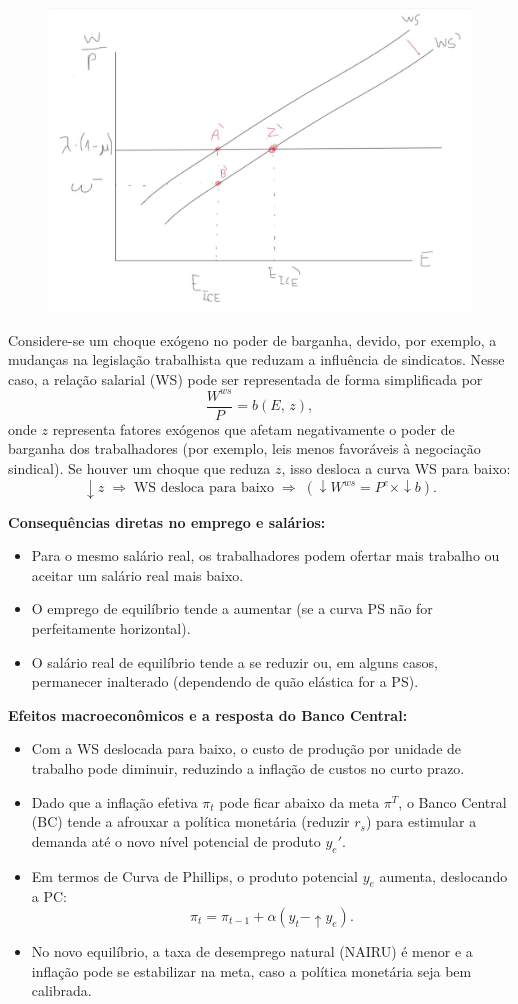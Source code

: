 \documentclass[a4paper,12pt]{article}[abntex2]
\begin{document}
\begin{figure}[H]
    \centering
    \includegraphics[width=0.7\linewidth]{Imagens/a14i3.png}
\end{figure}

Considere-se um choque exógeno no poder de barganha, devido, por exemplo, a mudanças na legislação trabalhista que reduzam a influência de sindicatos. Nesse caso, a relação salarial (WS) pode ser representada de forma simplificada por
\[
\frac{W^{ws}}{P} = b(E,\,z),
\]
onde $z$ representa fatores exógenos que afetam negativamente o poder de barganha dos trabalhadores (por exemplo, leis menos favoráveis à negociação sindical). Se houver um choque que reduza $z$, isso desloca a curva WS para baixo:
\[
\downarrow z \;\Longrightarrow\; \text{WS desloca para baixo} \;\Longrightarrow\; (\downarrow W^{ws} = P^e \times \downarrow b).
\]

\textbf{Consequências diretas no emprego e salários:}
\begin{itemize}
    \item Para o mesmo salário real, os trabalhadores podem ofertar mais trabalho ou aceitar um salário real mais baixo.
    \item O emprego de equilíbrio tende a aumentar (se a curva PS não for perfeitamente horizontal).
    \item O salário real de equilíbrio tende a se reduzir ou, em alguns casos, permanecer inalterado (dependendo de quão elástica for a PS).
\end{itemize}

\textbf{Efeitos macroeconômicos e a resposta do Banco Central:}
\begin{itemize}
    \item Com a WS deslocada para baixo, o custo de produção por unidade de trabalho pode diminuir, reduzindo a inflação de custos no curto prazo.
    \item Dado que a inflação efetiva $\pi_t$ pode ficar abaixo da meta $\pi^T$, o Banco Central (BC) tende a afrouxar a política monetária (reduzir $r_s$) para estimular a demanda até o novo nível potencial de produto $y_e'$.
    \item Em termos de Curva de Phillips, o produto potencial $y_e$ aumenta, deslocando a PC:
    \[
      \pi_t = \pi_{t-1} + \alpha (y_t - \uparrow y_e).
    \]
    \item No novo equilíbrio, a taxa de desemprego natural (NAIRU) é menor e a inflação pode se estabilizar na meta, caso a política monetária seja bem calibrada.
\end{itemize}
\end{document}
